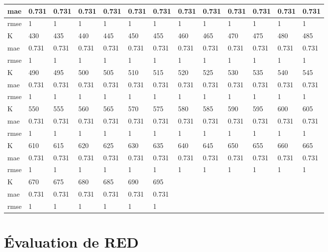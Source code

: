 \begin{appendices}
\begin{center}
\begin{tabularx}{\textwidth}{|l|X|X|X|X|X|X|X|X|X|X|X|X|}
		mae & 0.731 & 0.731 & 0.731 & 0.731 & 0.731 & 0.731 & 0.731 & 0.731 & 0.731 & 0.731 & 0.731 & 0.731 \\ \hline 
		rmse & 1 & 1 & 1 & 1 & 1 & 1 & 1 & 1 & 1 & 1 & 1 & 1 \\ \hline 
		\hline 
		K & 430 & 435 & 440 & 445 & 450 & 455 & 460 & 465 & 470 & 475 & 480 & 485 \\ \hline 
		mae & 0.731 & 0.731 & 0.731 & 0.731 & 0.731 & 0.731 & 0.731 & 0.731 & 0.731 & 0.731 & 0.731 & 0.731 \\ \hline 
		rmse & 1 & 1 & 1 & 1 & 1 & 1 & 1 & 1 & 1 & 1 & 1 & 1 \\ \hline 
		\hline 
		K & 490 & 495 & 500 & 505 & 510 & 515 & 520 & 525 & 530 & 535 & 540 & 545 \\ \hline 
		mae & 0.731 & 0.731 & 0.731 & 0.731 & 0.731 & 0.731 & 0.731 & 0.731 & 0.731 & 0.731 & 0.731 & 0.731 \\ \hline 
		rmse & 1 & 1 & 1 & 1 & 1 & 1 & 1 & 1 & 1 & 1 & 1 & 1 \\ \hline 
		\hline 
		K & 550 & 555 & 560 & 565 & 570 & 575 & 580 & 585 & 590 & 595 & 600 & 605 \\ \hline 
		mae & 0.731 & 0.731 & 0.731 & 0.731 & 0.731 & 0.731 & 0.731 & 0.731 & 0.731 & 0.731 & 0.731 & 0.731 \\ \hline 
		rmse & 1 & 1 & 1 & 1 & 1 & 1 & 1 & 1 & 1 & 1 & 1 & 1 \\ \hline 
		\hline 
		K & 610 & 615 & 620 & 625 & 630 & 635 & 640 & 645 & 650 & 655 & 660 & 665 \\ \hline 
		mae & 0.731 & 0.731 & 0.731 & 0.731 & 0.731 & 0.731 & 0.731 & 0.731 & 0.731 & 0.731 & 0.731 & 0.731 \\ \hline 
		rmse & 1 & 1 & 1 & 1 & 1 & 1 & 1 & 1 & 1 & 1 & 1 & 1 \\ \hline 
		\hline 
		K & 670 & 675 & 680 & 685 & 690 & 695  & & & & & & \\ \hline 
		mae & 0.731 & 0.731 & 0.731 & 0.731 & 0.731 & 0.731 & & & & & &  \\ \hline 
		rmse & 1 & 1 & 1 & 1 & 1 & 1  & & & & & & \\ \hline 
	\end{tabularx} 
\end{center}

\section*{Évaluation de RED}

\end{appendices}
